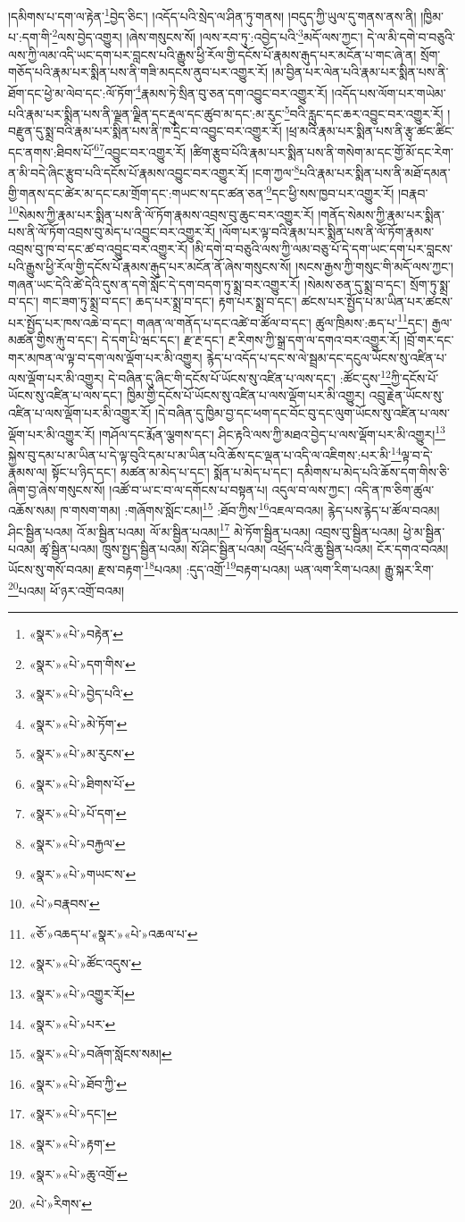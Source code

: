 །དམིགས་པ་དག་ལ་རྟེན་\footnote{«སྣར་»«པེ་»བརྟེན་}བྱེད་ཅིང་། །འདོད་པའི་སྲེད་ལ་ཤིན་ཏུ་གནས། །བདུད་ཀྱི་ཡུལ་དུ་གནས་ནས་ནི། །ཁྱིམ་པ་:དག་གི་\footnote{«སྣར་»«པེ་»དག་གིས་}ལས་བྱེད་འགྱུར། །ཞེས་གསུངས་སོ། །ལས་རབ་ཏུ་:འབྱེད་པའི་\footnote{«སྣར་»«པེ་»བྱེད་པའི་}མདོ་ལས་ཀྱང་། དེ་ལ་མི་དགེ་བ་བཅུའི་ལས་ཀྱི་ལམ་འདི་ཡང་དག་པར་བླངས་པའི་རྒྱུས་ཕྱི་རོལ་གྱི་དངོས་པོ་རྣམས་རྒུད་པར་མངོན་པ་གང་ཞེ་ན། སྲོག་གཅོད་པའི་རྣམ་པར་སྨིན་པས་ནི་གཟི་མདངས་ནུབ་པར་འགྱུར་རོ། །མ་བྱིན་པར་ལེན་པའི་རྣམ་པར་སྨིན་པས་ནི་ཐོག་དང་ཕྱེ་མ་ལེབ་དང་:ལོ་ཏོག་\footnote{«སྣར་»«པེ་»མེ་ཏོག་}རྣམས་ཏེ་སྲིན་བུ་ཅན་དག་འབྱུང་བར་འགྱུར་རོ། །འདོད་པས་ལོག་པར་གཡེམ་པའི་རྣམ་པར་སྨིན་པས་ནི་ལྗན་ལྗིན་དང་རྡུལ་དང་ཚུབ་མ་དང་:མ་རུང་\footnote{«སྣར་»«པེ་»མ་རུངས་}བའི་རླུང་དང་ཆར་འབྱུང་བར་འགྱུར་རོ། །བརྫུན་དུ་སྨྲ་བའི་རྣམ་པར་སྨིན་པས་ནི་ཁ་དྲིང་བ་འབྱུང་བར་འགྱུར་རོ། །ཕྲ་མའི་རྣམ་པར་སྨིན་པས་ནི་རྩྭ་ཚང་ཚིང་དང་ནགས་:ཐིབས་པོ་\footnote{«སྣར་»«པེ་»ཐིགས་པོ་}\footnote{«སྣར་»«པེ་»པོ་དག་}འབྱུང་བར་འགྱུར་རོ། །ཚིག་རྩུབ་པོའི་རྣམ་པར་སྨིན་པས་ནི་གསེག་མ་དང་གྱོ་མོ་དང་རེག་ན་མི་བདེ་ཞིང་རྩུབ་པའི་དངོས་པོ་རྣམས་འབྱུང་བར་འགྱུར་རོ། །ངག་ཀྱལ་\footnote{«སྣར་»«པེ་»བརྐྱལ་}པའི་རྣམ་པར་སྨིན་པས་ནི་མཐོ་དམན་གྱི་གནས་དང་ཚེར་མ་དང་ངམ་གྲོག་དང་:གཡང་ས་དང་ཚན་ཅན་\footnote{«སྣར་»«པེ་»གཡང་ས་}དང་ཕྱི་སས་ཁྱབ་པར་འགྱུར་རོ། །བརྣབ་\footnote{«པེ་»བརྣབས་}སེམས་ཀྱི་རྣམ་པར་སྨིན་པས་ནི་ལོ་ཏོག་རྣམས་འབྲས་བུ་ཆུང་བར་འགྱུར་རོ། །གནོད་སེམས་ཀྱི་རྣམ་པར་སྨིན་པས་ནི་ལོ་ཏོག་འབྲས་བུ་མེད་པ་འབྱུང་བར་འགྱུར་རོ། །ལོག་པར་ལྟ་བའི་རྣམ་པར་སྨིན་པས་ནི་ལོ་ཏོག་རྣམས་འབྲས་བུ་ཁ་བ་དང་ཚ་བ་འབྱུང་བར་འགྱུར་རོ། །མི་དགེ་བ་བཅུའི་ལས་ཀྱི་ལམ་བཅུ་པོ་དེ་དག་ཡང་དག་པར་བླངས་པའི་རྒྱུས་ཕྱི་རོལ་གྱི་དངོས་པོ་རྣམས་རྒུད་པར་མངོན་ནོ་ཞེས་གསུངས་སོ། །སངས་རྒྱས་ཀྱི་གསུང་གི་མདོ་ལས་ཀྱང་། གཞན་ཡང་དེའི་ཚེ་དེའི་དུས་ན་དགེ་སློང་དེ་དག་བདག་ཏུ་སྨྲ་བར་འགྱུར་རོ། །སེམས་ཅན་དུ་སྨྲ་བ་དང་། སྲོག་ཏུ་སྨྲ་བ་དང་། གང་ཟག་ཏུ་སྨྲ་བ་དང་། ཆད་པར་སྨྲ་བ་དང་། རྟག་པར་སྨྲ་བ་དང་། ཚངས་པར་སྤྱོད་པ་མ་ཡིན་པར་ཚངས་པར་སྤྱོད་པར་ཁས་འཆེ་བ་དང་། གཞན་ལ་གནོད་པ་དང་འཚེ་བ་ཚོལ་བ་དང་། ཚུལ་ཁྲིམས་:ཆད་པ་\footnote{«ཅོ་»འཆད་པ་«སྣར་»«པེ་»འཆལ་པ་}དང་། རྒྱལ་མཚན་གྱིས་རྐུ་བ་དང་། དེ་དག་པི་ཝང་དང་། རྫ་རྔ་དང་། རྔ་རིགས་ཀྱི་སྒྲ་དག་ལ་དགའ་བར་འགྱུར་རོ། །བྲོ་གར་དང་གར་མཁན་ལ་ལྟ་བ་དག་ལས་ལྡོག་པར་མི་འགྱུར། རྙེད་པ་འདོད་པ་དང་ས་ལེ་སྦྲམ་དང་དངུལ་ཡོངས་སུ་འཛིན་པ་ལས་ལྡོག་པར་མི་འགྱུར། དེ་བཞིན་དུ་ཞིང་གི་དངོས་པོ་ཡོངས་སུ་འཛིན་པ་ལས་དང་། :ཚོང་དུས་\footnote{«སྣར་»«པེ་»ཚོང་འདུས་}ཀྱི་དངོས་པོ་ཡོངས་སུ་འཛིན་པ་ལས་དང་། ཁྱིམ་གྱི་དངོས་པོ་ཡོངས་སུ་འཛིན་པ་ལས་ལྡོག་པར་མི་འགྱུར། འབྲུ་རྗེན་ཡོངས་སུ་འཛིན་པ་ལས་ལྡོག་པར་མི་འགྱུར་རོ། །དེ་བཞིན་དུ་ཁྱིམ་བྱ་དང་ཕག་དང་བོང་བུ་དང་ལུག་ཡོངས་སུ་འཛིན་པ་ལས་ལྡོག་པར་མི་འགྱུར་རོ། །གཤོལ་དང་རྨོན་ལྕགས་དང་། ཤིང་རྟའི་ལས་ཀྱི་མཐའ་བྱེད་པ་ལས་ལྡོག་པར་མི་འགྱུར།\footnote{«སྣར་»«པེ་»འགྱུར་རོ།} སྐྱེས་བུ་དམ་པ་མ་ཡིན་པ་དེ་ལྟ་བུའི་དམ་པ་མ་ཡིན་པའི་ཆོས་དང་ལྡན་པ་འདི་ལ་འཇིགས་:པར་མི་\footnote{«སྣར་»«པེ་»པར་}ལྟ་བ་དེ་རྣམས་ལ། སྟོང་པ་ཉིད་དང་། མཚན་མ་མེད་པ་དང་། སྨོན་པ་མེད་པ་དང་། དམིགས་པ་མེད་པའི་ཆོས་དག་གིས་ཅི་ཞིག་བྱ་ཞེས་གསུངས་སོ། །འཚོ་བ་ཡ་ང་བ་ལ་དགོངས་པ་བསྟན་པ། འདུལ་བ་ལས་ཀྱང་། འདི་ན་ཁ་ཅིག་ཚུལ་འཆོས་སམ། ཁ་གསག་གམ། :གཞོགས་སློང་ངམ།\footnote{«སྣར་»«པེ་»བཞོག་སློངས་སམ།} :ཐོབ་ཀྱིས་\footnote{«སྣར་»«པེ་»ཐོབ་ཀྱི་}འཇལ་བའམ། རྙེད་པས་རྙེད་པ་ཚོལ་བའམ། ཤིང་སྦྱིན་པའམ། འོ་མ་སྦྱིན་པའམ། ལོ་མ་སྦྱིན་པའམ།\footnote{«སྣར་»«པེ་»དང་།} མེ་ཏོག་སྦྱིན་པའམ། འབྲས་བུ་སྦྱིན་པའམ། ཕྱེ་མ་སྦྱིན་པའམ། ཚྭ་སྦྱིན་པའམ། ཁྲུས་སྤྱད་སྦྱིན་པའམ། སོ་ཤིང་སྦྱིན་པའམ། འཕྲོད་པའི་ཆུ་སྦྱིན་པའམ། ངོར་དགའ་བའམ། ཡོངས་སུ་གསོ་བའམ། རྫས་བརྟག་\footnote{«སྣར་»«པེ་»རྟག་}པའམ། :དུད་འགྲོ་\footnote{«སྣར་»«པེ་»ཆུ་འགྲོ་}བརྟག་པའམ། ཡན་ལག་རིག་པའམ། རྒྱུ་སྐར་རིག་\footnote{«པེ་»རིགས་}པའམ། ཕོ་ཉར་འགྲོ་བའམ། 